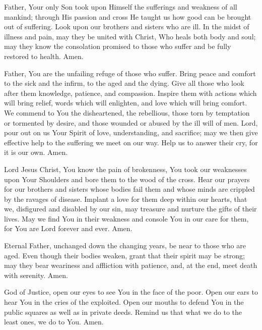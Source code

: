 Father, Your only Son took upon Himself the sufferings and weakness of all mankind; through His passion and cross He taught us how good can be brought out of suffering.
Look upon our brothers and sisters who are ill.
In the midst of illness and pain, may they be united with Christ, Who heals both body and soul; may they know the consolation promised to those who suffer and be fully restored to health.
Amen.

Father, You are the unfailing refuge of those who suffer.
Bring peace and comfort to the sick and the infirm, to the aged and the dying.
Give all those who look after them knowledge, patience, and compassion.
Inspire them with actions which will bring relief, words which will enlighten, and love which will bring comfort.
We commend to You the disheartened, the rebellious, those torn by temptation or tormented by desire, and those wounded or abused by the ill will of men.
Lord, pour out on us Your Spirit of love, understanding, and sacrifice; may we then give effective help to the suffering we meet on our way.
Help us to answer their cry, for it is our own.
Amen.

\label{prayer:profound_disabilities}
Lord Jesus Christ, 
You know the pain of brokenness, You took our weaknesses upon Your Shoulders and bore them to the wood of the cross.
Hear our prayers for our brothers and sisters whose bodies fail them and whose minds are crippled by the ravages of disease.
Implant a love for them deep within our hearts, that we, disfigured and disabled by our sin, may treasure and nurture the gifts of their lives.
May we find You in their weakness and console You in our care for them, for You are Lord forever and ever.
Amen.

Eternal Father, unchanged down the changing years, be near to those who are aged.
Even though their bodies weaken, grant that their spirit may be strong; may they bear weariness and affliction with patience, and, at the end, meet death with serenity.
Amen.

\label{prayer:poor}
God of Justice, open our eyes to see You in the face of the poor.
Open our ears to hear You in the cries of the exploited.
Open our mouths to defend You in the public squares as well as in private deeds.
Remind us that what we do to the least ones, we do to You.
Amen.

